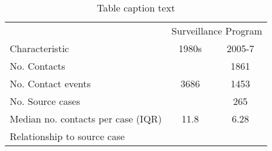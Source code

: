 \begin{table} %
\centering %
\caption{Table caption text} %
\begin{tabular}{l c c} %
\toprule %
& \multicolumn{2}{c}{Surveillance Program} \\ %
\cmidrule(l){2-3} %
Characteristic & 1980s & 2005-7 \\ %
\midrule %
No. Contacts & ~ & 1861 \\ %
No. Contact events &  3686 & 1453 \\ %
No. Source cases & ~ & 265 \\ %
Median no. contacts per case (IQR) & 11.8 & 6.28 \\ %
Relationship to source case & ~ & ~ \\ %
\bottomrule %
\end{tabular}
\label{tab:template} %
\end{table}
